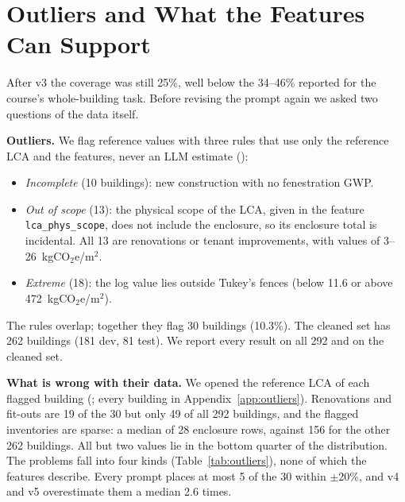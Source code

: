 \documentclass[10pt,letterpaper]{article}
\newcommand{\coe}{kgCO$_2$e/m$^2$}
\begin{document}
\section{Outliers and What the Features Can Support}
\label{sec:ceiling}
After v3 the coverage was still 25\%, well below the 34--46\% reported for the course's whole-building task. Before revising the prompt again we asked two questions of the data itself.

\textbf{Outliers.} We flag reference values with three rules that use only the reference LCA and the features, never an LLM estimate ():
\begin{itemize}
\item \emph{Incomplete} (10 buildings): new construction with no fenestration GWP.
\item \emph{Out of scope} (13): the physical scope of the LCA, given in the feature \texttt{lca\_phys\_scope}, does not include the enclosure, so its enclosure total is incidental. All 13 are renovations or tenant improvements, with values of 3--26~\coe.
\item \emph{Extreme} (18): the log value lies outside Tukey's fences (below 11.6 or above 472~\coe).
\end{itemize}
The rules overlap; together they flag 30 buildings (10.3\%). The cleaned set has 262 buildings (181 dev, 81 test). We report every result on all 292 and on the cleaned set.

\textbf{What is wrong with their data.} We opened the reference LCA of each flagged building (; every building in Appendix~\ref{app:outliers}). Renovations and fit-outs are 19 of the 30 but only 49 of all 292 buildings, and the flagged inventories are sparse: a median of 28 enclosure rows, against 156 for the other 262 buildings. All but two values lie in the bottom quarter of the distribution. The problems fall into four kinds (Table~\ref{tab:outliers}), none of which the features describe. Every prompt places at most 5 of the 30 within $\pm$20\%, and v4 and v5 overestimate them a median 2.6 times.
\end{document}
